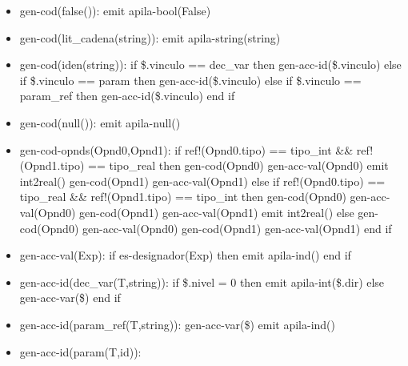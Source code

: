 \documentclass[11pt]{article}
\begin{document}
\begin{itemize}
            \item gen-cod(false()): 
                \subitem emit apila-bool(False)
            \item gen-cod(lit\_cadena(string)): 
                \subitem emit apila-string(string)
            \item gen-cod(iden(string)): 
                \subitem if \$.vinculo == dec\_var then 
                    \subsubitem gen-acc-id(\$.vinculo)
                \subitem else if \$.vinculo == param then 
                    \subsubitem gen-acc-id(\$.vinculo)
                \subitem else if \$.vinculo == param\_ref then 
                    \subsubitem gen-acc-id(\$.vinculo)
                \subitem end if
            \item gen-cod(null()): 
                \subitem emit apila-null()
            \item gen-cod-opnds(Opnd0,Opnd1): 
                \subitem if ref!(Opnd0.tipo) == tipo\_int \&\& ref!(Opnd1.tipo) == tipo\_real then
                    \subsubitem gen-cod(Opnd0)
                    \subsubitem gen-acc-val(Opnd0)
                    \subsubitem emit int2real()
                    \subsubitem gen-cod(Opnd1)
                    \subsubitem gen-acc-val(Opnd1)
                \subitem else if ref!(Opnd0.tipo) == tipo\_real \&\& ref!(Opnd1.tipo) == tipo\_int then
                    \subsubitem gen-cod(Opnd0)
                    \subsubitem gen-acc-val(Opnd0)
                    \subsubitem gen-cod(Opnd1)
                    \subsubitem gen-acc-val(Opnd1)
                    \subsubitem emit int2real()
                \subitem else
                    \subsubitem gen-cod(Opnd0)
                    \subsubitem gen-acc-val(Opnd0)
                    \subsubitem gen-cod(Opnd1)
                    \subsubitem gen-acc-val(Opnd1)
                \subitem end if
            \item gen-acc-val(Exp): 
                \subitem if es-designador(Exp) then
                    \subsubitem emit apila-ind()
                \subitem end if
            \item gen-acc-id(dec\_var(T,string)): 
                \subitem if \$.nivel = 0 then
                    \subsubitem emit apila-int(\$.dir)
                \subitem else
                    \subsubitem gen-acc-var(\$)
                \subitem end if
            \item gen-acc-id(param\_ref(T,string)): 
                \subitem gen-acc-var(\$)
                \subitem emit apila-ind()
            \item gen-acc-id(param(T,id)): 

\end{itemize}
\end{document}
